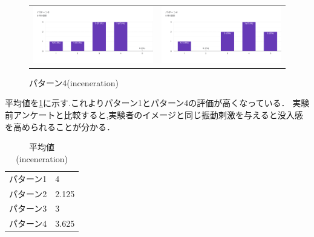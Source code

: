 \begin{figure}[h]
\begin{tabular}{cc}
      \begin{minipage}[t]{0.45\hsize}
        \centering
        \includegraphics[keepaspectratio, scale=0.5]{fig/inceneration3.png}
        \caption{パターン3(inceneration)}
        \label{ince3}
      \end{minipage} &
      \begin{minipage}[t]{0.45\hsize}
        \centering
        \includegraphics[keepaspectratio, scale=0.5]{fig/inceneration4.png}
        \caption{パターン4(inceneration)}
        \label{ince4}
      \end{minipage} 
    \end{tabular}
  \end{figure}

平均値を\ref{tab;inceAve}に示す.これよりパターン1とパターン4の評価が高くなっている．
実験前アンケートと比較すると,実験者のイメージと同じ振動刺激を与えると没入感を高められることが分かる．
\begin{table}[h]
    \caption{\label{tab;inceAve}平均値(inceneration)}
    \centering
    \begin{tabular}{l|l}
    \hline
    \hline
    パターン1 & 4\\
    パターン2 & 2.125\\
    パターン3 & 3\\
    パターン4 & 3.625\\
    \hline
    \end{tabular}
\end{table}

